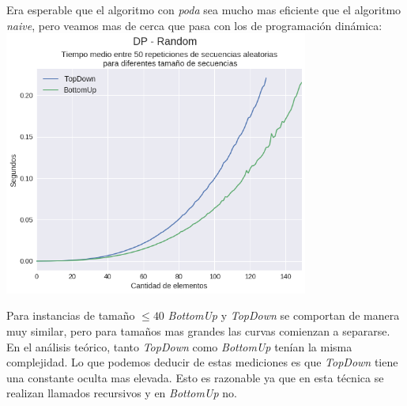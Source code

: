 Era esperable que el algoritmo con \textit{poda} sea mucho mas eficiente que el algoritmo \textit{naive}, pero veamos mas de cerca que pasa con los de programación dinámica: \\

{\centering
  \includegraphics[width=0.75\textwidth]{informe/img/experimentos/dp-random.png} \\
}

Para instancias de tamaño $\leq 40$ \textit{BottomUp} y \textit{TopDown} se comportan de manera muy similar, pero para tamaños mas grandes las curvas comienzan a separarse. \\

En el análisis teórico, tanto \textit{TopDown} como \textit{BottomUp} tenían la misma complejidad. Lo que podemos deducir de estas mediciones es que \textit{TopDown} tiene una constante oculta mas elevada. Esto es razonable ya que en esta técnica se realizan llamados recursivos y en \textit{BottomUp} no.